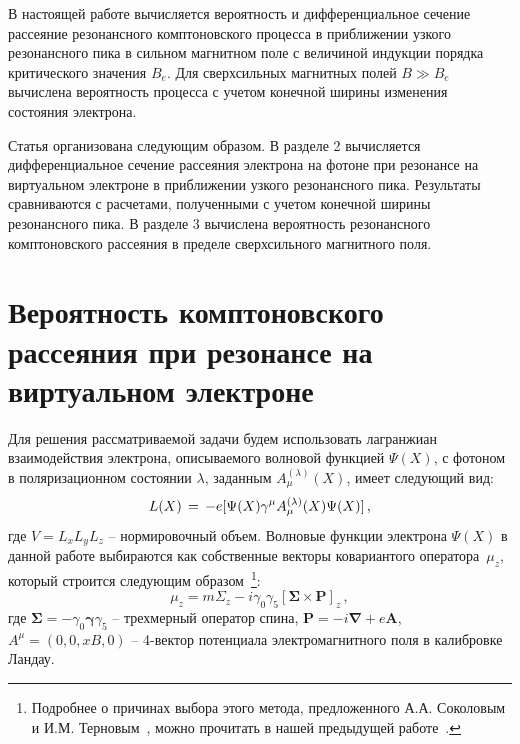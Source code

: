 \documentclass[cp1251%
               ]{jetp} %
\let\vec=\mathbf
\newcommand{\bs}{\boldsymbol}
\begin{document}
В настоящей работе вычисляется вероятность и дифференциальное сечение рассеяние резонансного комптоновского процесса в приближении узкого резонансного пика в сильном магнитном поле с величиной индукции порядка критического значения $B_e$. Для сверхсильных магнитных полей $B \gg B_e$ вычислена вероятность процесса с учетом конечной ширины изменения состояния электрона.

Статья организована следующим образом. В разделе 2 вычисляется дифференциальное сечение рассеяния электрона на фотоне при резонансе на виртуальном электроне в приближении узкого резонансного пика. Результаты сравниваются с расчетами, полученными с учетом конечной ширины резонансного пика. В разделе 3 вычислена вероятность резонансного комптоновского рассеяния в пределе сверхсильного магнитного поля. 





\section{Вероятность комптоновского рассеяния при резонансе на виртуальном электроне}

Для решения рассматриваемой задачи будем использовать лагранжиан взаимодействия электрона, описываемого волновой функцией $\Psi (X)$, с фотоном в поляризационном состоянии $\lambda$, заданным $A^{(\lambda)}_\mu (X)$,  имеет следующий вид:
%
\begin{equation}\label{eq:L}
	{\cal L}(X) \, = \,- e [\bar \Psi (X) \gamma^{\mu} A^{(\lambda)}_\mu (X) 
	\Psi(X)] \, ,
\end{equation}
%
\noindent где $V = L_x L_y L_z$ -- нормировочный объем. Волновые функции электрона $\Psi (X)$ в данной работе выбираются как собственные векторы ковариантого оператора~$\mu_z$, который строится следующим образом~\footnote{Подробнее о причинах выбора этого метода, предложенного А.А. Соколовым и И.М. Терновым~\cite{Sokolov:1968}, можно прочитать в нашей предыдущей работе~\cite{Rumyantsev:2017}.}: 
\begin{equation}\label{eq:muz}
	\mu_z=m \Sigma_z - i \gamma_0\gamma_5\left[\vec{\Sigma}\times 
	\vec{P}\right]_z\, ,
\end{equation}
%
\noindent где $\bs\Sigma = - \gamma_0 \bs\gamma \gamma_5$ -- трехмерный оператор спина, $\vec{P} = -i \vec{\nabla} +e \vec{A}$, $A^\mu=\left(0,0,xB,0\right)$ -- 4-вектор потенциала электромагнитного поля в калибровке Ландау.
\end{document}
